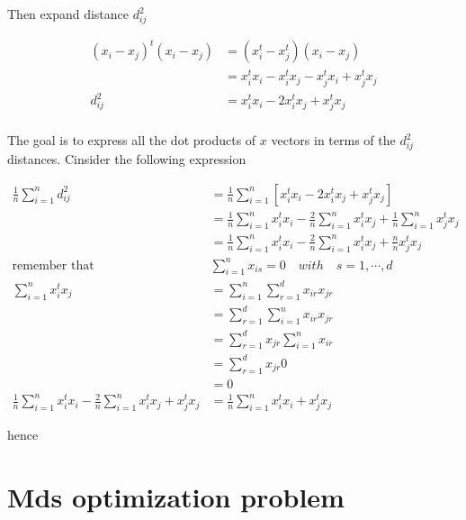 \documentclass{article}
\begin{document}
    Then expand distance $d_{ij}^2$

    \begin{equation*}
        \begin{aligned}
            (x_i-x_j)^t (x_i-x_j) &= (x_i^t-x_j^t) (x_i-x_j)\\
                                  &= x_i^t x_i - x_i^t x_j - x_j^t x_i + x_j^t x_j\\
                         d_{ij}^2 &= x_i^t x_i - 2 x_i^t x_j + x_j^t x_j\\
        \end{aligned}
    \end{equation*}

    The goal is to express all the dot products of $x$ vectors in terms of the
    $d_{ij}^2$ distances. Cinsider the following expression

    \begin{equation*}
        \begin{aligned}
            \frac{1}{n} \sum_{i=1}^n d_{ij}^2 &= \frac{1}{n} \sum_{i=1}^n [x_i^t x_i - 2 x_i^t x_j + x_j^t x_j]\\
            &=  \frac{1}{n} \sum_{i=1}^n x_i^t x_i - \frac{2}{n} \sum_{i=1}^n x_i^t x_j + \frac{1}{n} \sum_{i=1}^n x_j^t x_j\\
            &=  \frac{1}{n} \sum_{i=1}^n x_i^t x_i - \frac{2}{n} \sum_{i=1}^n x_i^t x_j + \frac{n}{n} x_j^t x_j \\
            \text{remember that} \quad & \sum_{i=1}^n x_{is} = 0 \quad with \quad s = 1, \cdots, d\\
            \sum_{i=1}^n x_i^t x_j &= \sum_{i=1}^n \sum_{r=1}^d x_{ir} x_{jr}\\
                                   &= \sum_{r=1}^d \sum_{i=1}^n x_{ir} x_{jr}\\
                                   &= \sum_{r=1}^d x_{jr} \sum_{i=1}^n x_{ir}\\
                                   &= \sum_{r=1}^d x_{jr} 0\\
                                   &= 0\\
            \frac{1}{n} \sum_{i=1}^n x_i^t x_i - \frac{2}{n} \sum_{i=1}^n x_i^t x_j + x_j^t x_j 
            &= 
            \frac{1}{n} \sum_{i=1}^n x_i^t x_i + x_j^t x_j 
        \end{aligned}
    \end{equation*}

    hence

    \section{Mds optimization problem}
\end{document}
